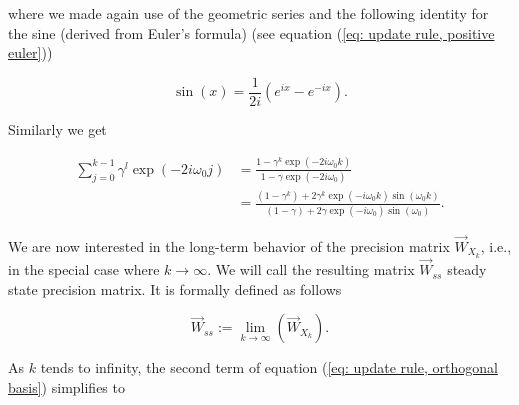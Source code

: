 \documentclass[11pt,a4paper,twoside]{report}
\newcommand{\messF}[3]{\overrightarrow{#1}_{{#2}_{k{#3}}}}
\begin{document}
\noindent where we made again use of the geometric series and the following identity for the sine (derived from Euler's formula) (see equation (\ref{eq: update rule, positive euler}))

\begin{equation*}
	\sin{\left(x\right)} = \frac{1}{2i}\left(e^{ix} - e^{-ix}\right).
\end{equation*}

\noindent Similarly we get

\begin{align}
\label{eq: update rule, negative euler}
	\sum_{j=0}^{k-1}\gamma^{l}\exp{\left(-2i\omega_0j\right)} &= \frac{1-\gamma^{k}\exp{\left(-2i\omega_0k\right)}}{1-\gamma \exp{\left(-2i\omega_0\right)}} \\
	&= \frac{\left(1-\gamma^{k}\right) + 2\gamma^{k} \exp{\left(-i\omega_0k\right)}\sin\left(\omega_0 k\right)}{\left(1-\gamma\right) + 2\gamma \exp{\left(-i\omega_0\right)}\sin\left(\omega_0\right)}. 
\end{align}

We are now interested in the long-term behavior of the precision matrix $\messF{W}{X}{}$, i.e., in the special case where $k \rightarrow \infty$. We will call the resulting matrix $\overrightarrow{W}_{ss}$ steady state precision matrix. It is formally defined as follows

\begin{equation*}
	 \overrightarrow{W}_{ss} := \underset{k \rightarrow \infty}{\lim}\left( \messF{W}{X}{} \right).
\end{equation*}

\noindent As $k$ tends to infinity, the second term of equation (\ref{eq: update rule, orthogonal basis}) simplifies to
\end{document}
